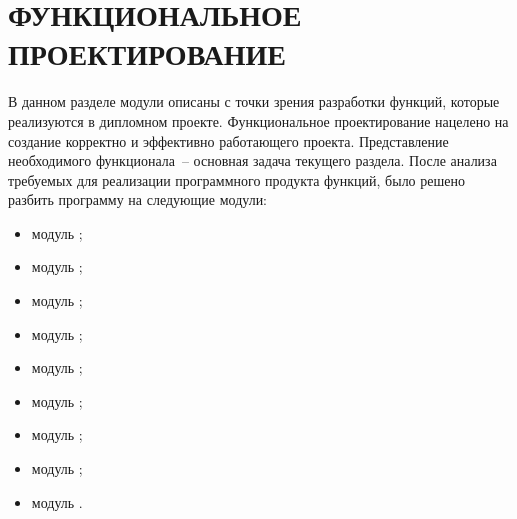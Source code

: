 \section{ФУНКЦИОНАЛЬНОЕ ПРОЕКТИРОВАНИЕ}
\label{sec:func}


В данном разделе модули описаны с точки зрения разработки функций, которые реализуются в
дипломном проекте. Функциональное проектирование нацелено на создание корректно и
эффективно работающего проекта. Представление необходимого функционала~-- основная задача
текущего раздела. После анализа требуемых для реализации программного продукта
функций, было решено разбить программу на следующие модули:

\begin{itemize}
    \item модуль \moduleCfg;
    \item модуль \moduleXml;
    \item модуль \moduleSettingsApply;
    \item модуль \moduleRecvPackets;
    \item модуль \moduleThreads;
    \item модуль \moduleProcessPackets;
    \item модуль \moduleDataStoring;
    \item модуль \moduleOsal;
    \item модуль \moduleLog.
\end{itemize}


